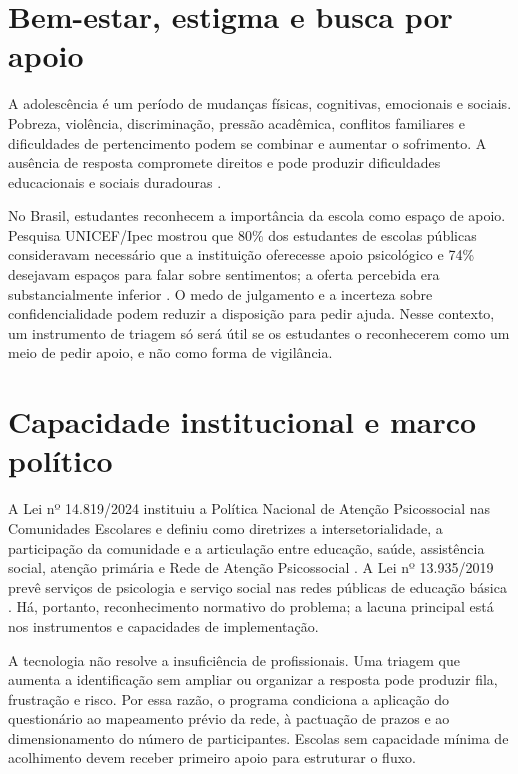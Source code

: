 \documentclass[
  12pt,
  openright,
  oneside,
  a4paper,
  english,
  brazil
]{abntex2}
\begin{document}
\section{Bem-estar, estigma e busca por apoio}

A adolescência é um período de mudanças físicas, cognitivas, emocionais e
sociais. Pobreza, violência, discriminação, pressão acadêmica, conflitos
familiares e dificuldades de pertencimento podem se combinar e aumentar o
sofrimento. A ausência de resposta compromete direitos e pode produzir
dificuldades educacionais e sociais duradouras \cite{who2025}.

No Brasil, estudantes reconhecem a importância da escola como espaço de apoio.
Pesquisa UNICEF/Ipec mostrou que 80\% dos estudantes de escolas públicas
consideravam necessário que a instituição oferecesse apoio psicológico e 74\%
desejavam espaços para falar sobre sentimentos; a oferta percebida era
substancialmente inferior \cite{unicef2022voz}. O medo de julgamento e a
incerteza sobre confidencialidade podem reduzir a disposição para pedir ajuda.
Nesse contexto, um instrumento de triagem só será útil se os estudantes o
reconhecerem como um meio de pedir apoio, e não como forma de vigilância.

\section{Capacidade institucional e marco político}

A Lei nº 14.819/2024 instituiu a Política Nacional de Atenção Psicossocial nas
Comunidades Escolares e definiu como diretrizes a intersetorialidade, a
participação da comunidade e a articulação entre educação, saúde, assistência
social, atenção primária e Rede de Atenção Psicossocial \cite{brasil14819}. A
Lei nº 13.935/2019 prevê serviços de psicologia e serviço social nas redes
públicas de educação básica \cite{brasil13935}. Há, portanto, reconhecimento
normativo do problema; a lacuna principal está nos instrumentos e capacidades de
implementação.

A tecnologia não resolve a insuficiência de profissionais. Uma triagem que
aumenta a identificação sem ampliar ou organizar a resposta pode produzir fila,
frustração e risco. Por essa razão, o programa condiciona a aplicação do
questionário ao mapeamento prévio da rede, à pactuação de prazos e ao
dimensionamento do número de participantes. Escolas sem capacidade mínima de
acolhimento devem receber primeiro apoio para estruturar o fluxo.
\end{document}
